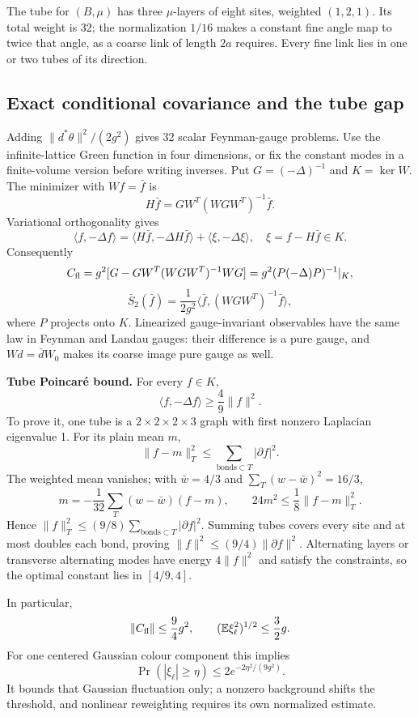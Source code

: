 \documentclass[11pt,a4paper]{article}
\begin{document}
The tube for \((B,\mu)\) has three \(\mu\)-layers of eight sites,
weighted \((1,2,1)\). Its total weight is 32; the normalization \(1/16\)
makes a constant fine angle map to twice that angle, as a coarse link of
length \(2a\) requires. Every fine link lies in one or two tubes of its
direction.

\hypertarget{exact-conditional-covariance-and-the-tube-gap}{%
\subsection{Exact conditional covariance and the tube
gap}\label{exact-conditional-covariance-and-the-tube-gap}}

Adding \(\|d^*\theta\|^2/(2g^2)\) gives 32 scalar Feynman-gauge
problems. Use the infinite-lattice Green function in four dimensions, or
fix the constant modes in a finite-volume version before writing
inverses. Put \(G=(-\Delta)^{-1}\) and \(K=\ker W\). The minimizer with
\(Wf=\bar f\) is \[H\bar f=GW^T(WGW^T)^{-1}\bar f.\] Variational
orthogonality gives \[\langle f,-\Delta f\rangle
=\langle H\bar f,-\Delta H\bar f\rangle+\langle\xi,-\Delta\xi\rangle,
\quad \xi=f-H\bar f\in K.\] Consequently
\[C_{\rm fl}=g^2[G-GW^T(WGW^T)^{-1}WG]
=g^2(P(-\Delta)P)^{-1}|_K,\] \[\bar S_2(\bar f)=\frac1{2g^2}
 \langle\bar f,(WGW^T)^{-1}\bar f\rangle,\] where \(P\) projects onto
\(K\). Linearized gauge-invariant observables have the same law in
Feynman and Landau gauges: their difference is a pure gauge, and
\(Wd=\bar dW_0\) makes its coarse image pure gauge as well.

\textbf{Tube Poincaré bound.} For every \(f\in K\),
\[\langle f,-\Delta f\rangle\ge\frac49\|f\|^2.\] To prove it, one tube
is a \(2\times2\times2\times3\) graph with first nonzero Laplacian
eigenvalue 1. For its plain mean \(m\),
\[\|f-m\|_T^2\le\sum_{\text{bonds}\subset T}|\partial f|^2.\] The
weighted mean vanishes; with \(\bar w=4/3\) and
\(\sum_T(w-\bar w)^2=16/3\), \[m=-\frac1{32}\sum_T(w-\bar w)(f-m),\qquad
24m^2\le\frac18\|f-m\|_T^2.\] Hence
\(\|f\|_T^2\le(9/8)\sum_{\text{bonds}\subset T}|\partial f|^2\). Summing
tubes covers every site and at most doubles each bond, proving
\(\|f\|^2\le(9/4)\|\partial f\|^2\). Alternating layers or transverse
alternating modes have energy \(4\|f\|^2\) and satisfy the constraints,
so the optimal constant lies in \([4/9,4]\).

In particular, \[\|C_{\rm fl}\|\le\frac94g^2,\qquad
 (\mathbb E\xi_\ell^2)^{1/2}\le\frac32g.\] For one centered Gaussian
colour component this implies
\[\Pr(|\xi_\ell|\ge\eta)\le2e^{-2\eta^2/(9g^2)}.\] It bounds that
Gaussian fluctuation only; a nonzero background shifts the threshold,
and nonlinear reweighting requires its own normalized estimate.
\end{document}
